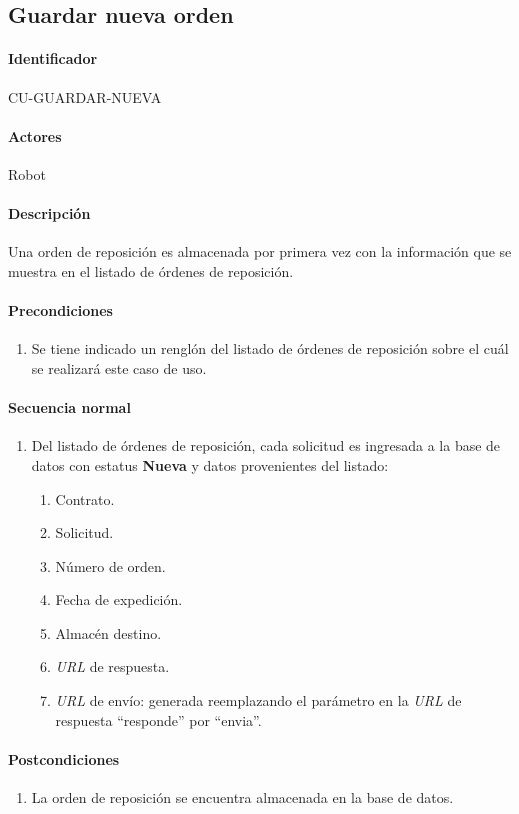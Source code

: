 \subsection{Guardar nueva orden}
\paragraph*{Identificador}
CU-GUARDAR-NUEVA
\paragraph*{Actores}
Robot
\paragraph*{Descripción}
Una orden de reposición es almacenada por primera vez con la información que se muestra en el listado de órdenes de reposición.
\paragraph*{Precondiciones}
\begin{enumerate}
  \item Se tiene indicado un renglón del listado de órdenes de reposición sobre el cuál se realizará este caso de uso.
\end{enumerate}
\paragraph*{Secuencia normal}
\begin{enumerate}
  \item Del listado de órdenes de reposición, cada solicitud es ingresada a la base de datos con estatus \textbf{Nueva} y datos provenientes del listado:
  \begin{enumerate}
    \item Contrato.
    \item Solicitud.
    \item Número de orden.
    \item Fecha de expedición.
    \item Almacén destino.
    \item \textit{URL} de respuesta.
    \item \textit{URL} de envío: generada reemplazando el parámetro en la \textit{URL} de respuesta ``responde'' por ``envia''.
  \end{enumerate}
\end{enumerate}
\paragraph*{Postcondiciones}
\begin{enumerate}
  \item La orden de reposición se encuentra almacenada en la base de datos.
\end{enumerate}
